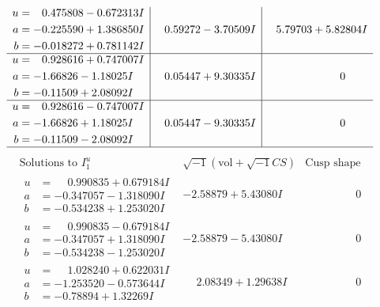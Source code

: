 \documentclass[1p]{elsarticle_modified}
\theoremstyle{definition}
\newcommand{\I}{\sqrt{-1}}
\begin{document}
$$\begin{array}{c|c|c}
\begin{aligned}
u &= \phantom{-}0.475808 - 0.672313 I \\
a &= -0.225590 + 1.386850 I \\
b &= -0.018272 + 0.781142 I\end{aligned}
 & \phantom{-}0.59272 - 3.70509 I & \phantom{-}5.79703 + 5.82804 I \\ \hline\begin{aligned}
u &= \phantom{-}0.928616 + 0.747007 I \\
a &= -1.66826 - 1.18025 I \\
b &= -0.11509 + 2.08092 I\end{aligned}
 & \phantom{-}0.05447 + 9.30335 I & \phantom{-0.000000 } 0 \\ \hline\begin{aligned}
u &= \phantom{-}0.928616 - 0.747007 I \\
a &= -1.66826 + 1.18025 I \\
b &= -0.11509 - 2.08092 I\end{aligned}
 & \phantom{-}0.05447 - 9.30335 I & \phantom{-0.000000 } 0\\
 \hline 
 \end{array}$$\newpage$$\begin{array}{c|c|c}  
\text{Solutions to }I^u_{1}& \I (\text{vol} + \sqrt{-1}CS) & \text{Cusp shape}\\
 \hline 
\begin{aligned}
u &= \phantom{-}0.990835 + 0.679184 I \\
a &= -0.347057 - 1.318090 I \\
b &= -0.534238 + 1.253020 I\end{aligned}
 & -2.58879 + 5.43080 I & \phantom{-0.000000 } 0 \\ \hline\begin{aligned}
u &= \phantom{-}0.990835 - 0.679184 I \\
a &= -0.347057 + 1.318090 I \\
b &= -0.534238 - 1.253020 I\end{aligned}
 & -2.58879 - 5.43080 I & \phantom{-0.000000 } 0 \\ \hline\begin{aligned}
u &= \phantom{-}1.028240 + 0.622031 I \\
a &= -1.253520 - 0.573644 I \\
b &= -0.78894 + 1.32269 I\end{aligned}
 & \phantom{-}2.08349 + 1.29638 I & \phantom{-0.000000 } 0 \\ \hline\begin{aligned}

\end{aligned}
\end{array}$$
\end{document}
